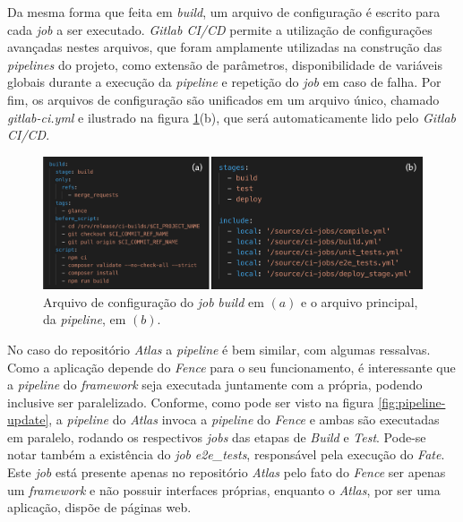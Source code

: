Da mesma forma que feita em \emph{build}, um arquivo de configuração é escrito para cada \emph{job} a ser executado. \emph{Gitlab CI/CD} permite a utilização de configurações avançadas nestes arquivos, que foram amplamente utilizadas na construção das \emph{pipelines} do projeto, como extensão de parâmetros, disponibilidade de variáveis globais durante a execução da \emph{pipeline} e repetição do \emph{job} em caso de falha. Por fim, os arquivos de configuração são unificados em um arquivo único, chamado \emph{gitlab-ci.yml} e ilustrado na figura \ref{fig:pipeline-2}(b), que será automaticamente lido pelo \emph{Gitlab CI/CD}.

\begin{figure}[H]
    \centering
    \includegraphics[width=15cm]{source/4-solucao/images/pipeline-2.png}
    \caption{Arquivo de configuração do \emph{job} \emph{build} em $(a)$ e o arquivo principal, da \emph{pipeline}, em $(b)$.}
    \label{fig:pipeline-2}
\end{figure}

No caso do repositório \emph{Atlas} a \emph{pipeline} é bem similar, com algumas ressalvas. Como a aplicação depende do \emph{Fence} para o seu funcionamento, é interessante que a \emph{pipeline} do \emph{framework} seja executada juntamente com a própria, podendo inclusive ser paralelizado. Conforme, como pode ser visto na figura \ref{fig:pipeline-update}, a \emph{pipeline} do \emph{Atlas} invoca a \emph{pipeline} do \emph{Fence} e ambas são executadas em paralelo, rodando os respectivos \emph{jobs} das etapas de \emph{Build} e \emph{Test}. Pode-se notar também a existência do \emph{job} \emph{e2e\_tests}, responsável pela execução do \emph{Fate}. Este \emph{job} está presente apenas no repositório \emph{Atlas} pelo fato do \emph{Fence} ser apenas um \emph{framework} e não possuir interfaces próprias, enquanto o \emph{Atlas}, por ser uma aplicação, dispõe de páginas web.

